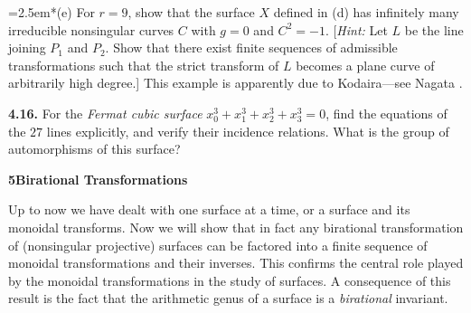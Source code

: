 {\noindent\hangindent=2.5em\hspace*{.9em}*(e) For $r=9$, show that the surface $X$ defined in (d) has infinitely many irreducible nonsingular curves $C$ with $g=0$ and $C^2=-1$. [\emph{Hint:} Let $L$ be the line joining $P_1$ and $P_2$. Show that there exist finite sequences of admissible transformations such that the strict transform of $L$ becomes a plane curve of arbitrarily high degree.] This example is apparently due to Kodaira---see Nagata .

\smallskip
\noindent\hypertarget{ex-V-4.16}{}\textbf{4.16.} For the \emph{Fermat cubic surface} $x_0^3+x_1^3+x_2^3+x_3^3=0$, find the equations of the $27$ lines explicitly, and verify their incidence relations. What is the group of automorphisms of this surface?

\bigskip
\noindent\hypertarget{sec-V-5}{}\textbf{\large 5\quad Birational Transformations}\par\medskip
\noindent Up to now we have dealt with one surface at a time, or a surface and its monoidal transforms. Now we will show that in fact any birational transformation of (nonsingular projective) surfaces can be factored into a finite sequence of monoidal transformations and their inverses. This confirms the central role played by the monoidal transformations in the study of surfaces. A consequence of this result is the fact that the arithmetic genus of a surface is a \emph{birational} invariant.}
